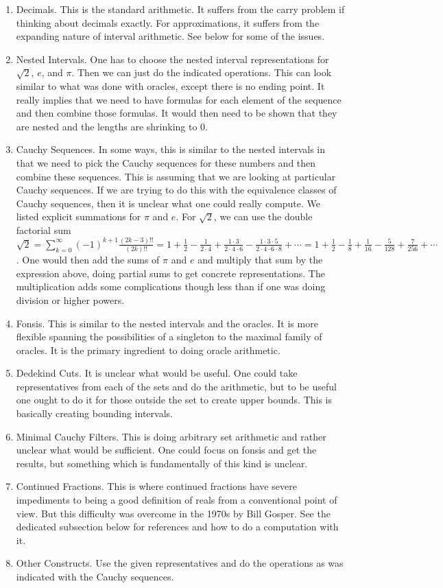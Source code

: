 \documentclass[12pt]{article}
\begin{document}
\begin{enumerate}
\item Decimals. This is the standard arithmetic. It suffers from the carry problem if thinking about decimals exactly. For approximations, it suffers from the expanding nature of interval arithmetic. See below for some of the issues. 
\item Nested Intervals. One has to choose the nested interval representations for $\sqrt{2}$, $e$, and $\pi$. Then we can just do the indicated operations. This can look similar to what was done with oracles, except there is no ending point. It really implies that we need to have formulas for each element of the sequence and then combine those formulas. It would then need to be shown that they are nested and the lengths are shrinking to 0. 
\item Cauchy Sequences. In some ways, this is similar to the nested intervals in that we need to pick the Cauchy sequences for these numbers and then combine these sequences. This is assuming that we are looking at particular Cauchy sequences. If we are trying to do this with the equivalence classes of Cauchy sequences, then it is unclear what one could really compute. We listed explicit summations for $\pi$ and $e$. For $\sqrt{2}$, we can use the double factorial sum $\sqrt{2} = \sum_{k=0}^\infty (-1)^{k+1} \frac{(2k-3)!!}{(2k)!!} =
1 + \frac{1}{2} - \frac{1}{2\cdot4} + \frac{1\cdot3}{2\cdot4\cdot6} - \frac{1\cdot3\cdot5}{2\cdot4\cdot6\cdot8} + \cdots = 1 + \frac{1}{2} - \frac{1}{8} + \frac{1}{16} - \frac{5}{128} + \frac{7}{256} + \cdots$. One would then add the sums of $\pi$ and $e$ and multiply that sum by the expression above, doing partial sums to get concrete representations. The multiplication adds some complications though less than if one was doing division or higher powers. 
\item Fonsis. This is similar to the nested intervals and the oracles. It is more flexible spanning the possibilities of a singleton to the maximal family of oracles. It is the primary ingredient to doing oracle arithmetic. 
\item Dedekind Cuts. It is unclear what would be useful. One could take representatives from each of the sets and do the arithmetic, but to be useful one ought to do it for those outside the set to create upper bounds. This is basically creating bounding intervals. 
\item Minimal Cauchy Filters. This is doing arbitrary set arithmetic and rather unclear what would be sufficient. One could focus on fonsis and get the results, but something which is fundamentally of this kind is unclear. 
\item Continued Fractions. This is where continued fractions have severe impediments to being a good definition of reals from a conventional point of view. But this difficulty was overcome in the 1970s by Bill Gosper. See the dedicated subsection below for references and how to do a computation with it. 
\item Other Constructs. Use the given representatives and do the operations as was indicated with the Cauchy sequences. 
\end{enumerate}
\end{document}
